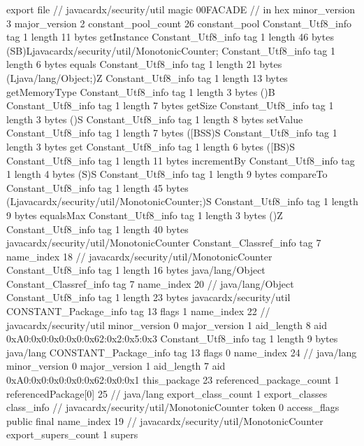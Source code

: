 export file {		// javacardx/security/util
	magic	00FACADE		 // in hex
	minor_version	3
	major_version	2
	constant_pool_count	26
	constant_pool {
		Constant_Utf8_info {
			tag	1
			length	11
			bytes	getInstance
		}
		Constant_Utf8_info {
			tag	1
			length	46
			bytes	(SB)Ljavacardx/security/util/MonotonicCounter;
		}
		Constant_Utf8_info {
			tag	1
			length	6
			bytes	equals
		}
		Constant_Utf8_info {
			tag	1
			length	21
			bytes	(Ljava/lang/Object;)Z
		}
		Constant_Utf8_info {
			tag	1
			length	13
			bytes	getMemoryType
		}
		Constant_Utf8_info {
			tag	1
			length	3
			bytes	()B
		}
		Constant_Utf8_info {
			tag	1
			length	7
			bytes	getSize
		}
		Constant_Utf8_info {
			tag	1
			length	3
			bytes	()S
		}
		Constant_Utf8_info {
			tag	1
			length	8
			bytes	setValue
		}
		Constant_Utf8_info {
			tag	1
			length	7
			bytes	([BSS)S
		}
		Constant_Utf8_info {
			tag	1
			length	3
			bytes	get
		}
		Constant_Utf8_info {
			tag	1
			length	6
			bytes	([BS)S
		}
		Constant_Utf8_info {
			tag	1
			length	11
			bytes	incrementBy
		}
		Constant_Utf8_info {
			tag	1
			length	4
			bytes	(S)S
		}
		Constant_Utf8_info {
			tag	1
			length	9
			bytes	compareTo
		}
		Constant_Utf8_info {
			tag	1
			length	45
			bytes	(Ljavacardx/security/util/MonotonicCounter;)S
		}
		Constant_Utf8_info {
			tag	1
			length	9
			bytes	equalsMax
		}
		Constant_Utf8_info {
			tag	1
			length	3
			bytes	()Z
		}
		Constant_Utf8_info {
			tag	1
			length	40
			bytes	javacardx/security/util/MonotonicCounter
		}
		Constant_Classref_info {
			tag	7
			name_index	18		// javacardx/security/util/MonotonicCounter
		}
		Constant_Utf8_info {
			tag	1
			length	16
			bytes	java/lang/Object
		}
		Constant_Classref_info {
			tag	7
			name_index	20		// java/lang/Object
		}
		Constant_Utf8_info {
			tag	1
			length	23
			bytes	javacardx/security/util
		}
		CONSTANT_Package_info {
			tag	13
			flags	1
			name_index	22		// javacardx/security/util
			minor_version	0
			major_version	1
			aid_length	8
			aid	0xA0:0x0:0x0:0x0:0x62:0x2:0x5:0x3
		}
		Constant_Utf8_info {
			tag	1
			length	9
			bytes	java/lang
		}
		CONSTANT_Package_info {
			tag	13
			flags	0
			name_index	24		// java/lang
			minor_version	0
			major_version	1
			aid_length	7
			aid	0xA0:0x0:0x0:0x0:0x62:0x0:0x1
		}
	}
	this_package	23
	referenced_package_count	1
	referencedPackage[0]	25		// java/lang
	export_class_count	1
	export_classes {
		class_info {		// javacardx/security/util/MonotonicCounter
			token	0
			access_flags	public final
			name_index	19		// javacardx/security/util/MonotonicCounter
			export_supers_count	1
			supers {
}}}}
